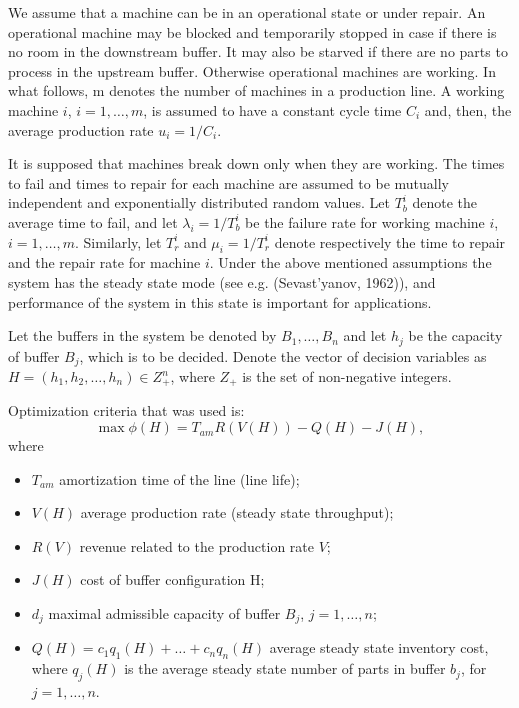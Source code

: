 \documentclass{ifacconf}
\begin{document}
We assume that a machine can be in an operational state or under 
repair. An operational machine may be blocked and temporarily stopped in case if there 
is  no  room  in  the  downstream  buffer.  It  may  also  be  starved  if  there  are  no  parts  to 
process  in  the  upstream  buffer. Otherwise operational machines are working. In what 
follows, m denotes the number of machines in a production line. A working machine $i$, 
$i=1,…,m$, is assumed to have a constant cycle time $C_i$ and, then, the average production 
rate $u_i=1/C_i$. 

It is supposed that machines break down only when they are working. The times to fail 
and  times  to  repair  for  each  machine  are  assumed  to  be  mutually  independent  and 
exponentially distributed random values. Let $T_b^i$ denote the average time to fail, and let 
$\lambda_i=1/T_b^i$ be the failure rate for working machine $i$, $i=1,…,m$. Similarly, let $T_r^i$ and $\mu_i=1/T_r^i$  
denote  respectively  the  time  to  repair  and  the repair rate for machine $i$. Under the 
above  mentioned  assumptions  the  system  has  the  steady  state  mode  (see  e.g. 
(Sevast'yanov,  1962)),  and  performance  of  the  system  in  this  state  is  important  for 
applications.

Let the buffers in the system be denoted by $B_1,…,B_n$ and let $h_j$ be the capacity of buffer 
$B_j$,  which  is  to  be  decided.  Denote  the  vector  of  decision  variables  as  $H=  (h_1,  h_2,…, h_n )\in  Z_+^n$,  where  $Z_+$  is  the  set  of  non-negative  integers.  

Optimization criteria that was used is:
\begin{equation}
\label{criteria}
\max \phi(H)=T_{am} R(V(H)) - Q(H) - J(H),
\end{equation}
where 
\begin{itemize}
\item $T_{am}$  amortization time of the line (line life); 
\item $V(H)$  average production rate (steady state throughput); 
\item $R(V)$  revenue related to the production rate $V$; 
\item $J(H)$ cost of buffer configuration H; 
\item $d_j$ maximal admissible capacity of buffer $B_j$, $j=1,…,n$;
\item $Q(H)= c_1q_1(H)+ …+c_n q_n(H)$ average steady state inventory cost, where $q_j(H)$ is the average steady state number of parts in buffer $b_j$, for $j=1,…,n$.
\end{itemize}
\end{document}
